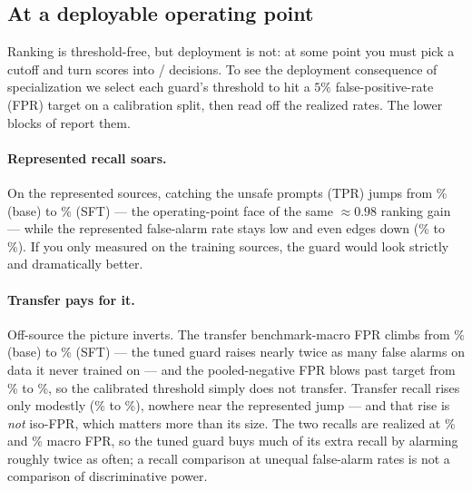 \subsection{At a deployable operating point}
\label{sec:actI-op}

Ranking is threshold-free, but deployment is not: at some point you must pick a cutoff and turn scores
into / decisions. To see the deployment consequence of specialization we select
each guard's threshold to hit a $5\%$ false-positive-rate (FPR) target on a calibration split, then read
off the realized rates. The lower blocks of  report them.

\paragraph{Represented recall soars.} On the represented sources, catching the unsafe prompts (TPR)
jumps from \RepBaseTPRPct\% (base) to \RepSFTTPRPct\% (SFT) --- the operating-point face of the same
$\approx 0.98$ ranking gain --- while the represented false-alarm rate stays low and even edges down
(\RepBaseFPRPct\% to \RepSFTFPRPct\%). If you only measured on the training sources, the guard would
look strictly and dramatically better.

\paragraph{Transfer pays for it.} Off-source the picture inverts. The transfer benchmark-macro FPR
climbs from \TransferBaseFPRPct\% (base) to \TransferSFTFPRPct\% (SFT) --- the tuned guard raises nearly
twice as many false alarms on data it never trained on --- and the pooled-negative FPR blows past target
from \TransferBasePooledFPRPct\% to \TransferSFTPooledFPRPct\%, so the calibrated threshold simply does
not transfer. Transfer recall rises only modestly (\TransferBaseTPRPct\% to \TransferSFTTPRPct\%),
nowhere near the represented jump --- and that rise is \emph{not} iso-FPR, which matters more than its
size. The two recalls are realized at \TransferBaseFPRPct\% and \TransferSFTFPRPct\% macro FPR, so the
tuned guard buys much of its extra recall by alarming roughly twice as often; a recall comparison at
unequal false-alarm rates is not a comparison of discriminative power.

